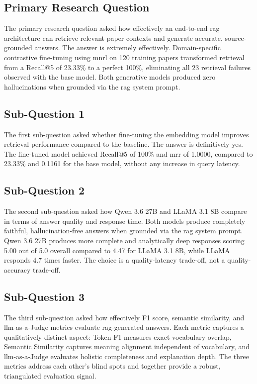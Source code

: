 \subsection{Primary Research Question}

The primary research question asked how effectively an end-to-end \gls{rag} architecture can retrieve relevant paper contexts and generate accurate, source-grounded answers. The answer is extremely effectively. Domain-specific contrastive fine-tuning using \gls{mnrl} on 120 training papers transformed retrieval from a Recall@5 of 23.33\% to a perfect 100\%, eliminating all 23 retrieval failures observed with the base model. Both generative models produced zero hallucinations when grounded via the \gls{rag} system prompt.

\subsection{Sub-Question 1}

The first sub-question asked whether fine-tuning the embedding model improves retrieval performance compared to the baseline. The answer is definitively yes. The fine-tuned model achieved Recall@5 of 100\% and \gls{mrr} of 1.0000, compared to 23.33\% and 0.1161 for the base model, without any increase in query latency.

\subsection{Sub-Question 2}

The second sub-question asked how Qwen 3.6 27B and LLaMA 3.1 8B compare in terms of answer quality and response time. Both models produce completely faithful, hallucination-free answers when grounded via the \gls{rag} system prompt. Qwen 3.6 27B produces more complete and analytically deep responses scoring 5.00 out of 5.0 overall compared to 4.47 for LLaMA 3.1 8B, while LLaMA responds 4.7 times faster. The choice is a quality-latency trade-off, not a quality-accuracy trade-off.

\subsection{Sub-Question 3}

The third sub-question asked how effectively F1 score, semantic similarity, and \gls{llm}-as-a-Judge metrics evaluate \gls{rag}-generated answers. Each metric captures a qualitatively distinct aspect: Token F1 measures exact vocabulary overlap, Semantic Similarity captures meaning alignment independent of vocabulary, and \gls{llm}-as-a-Judge evaluates holistic completeness and explanation depth. The three metrics address each other's blind spots and together provide a robust, triangulated evaluation signal.

